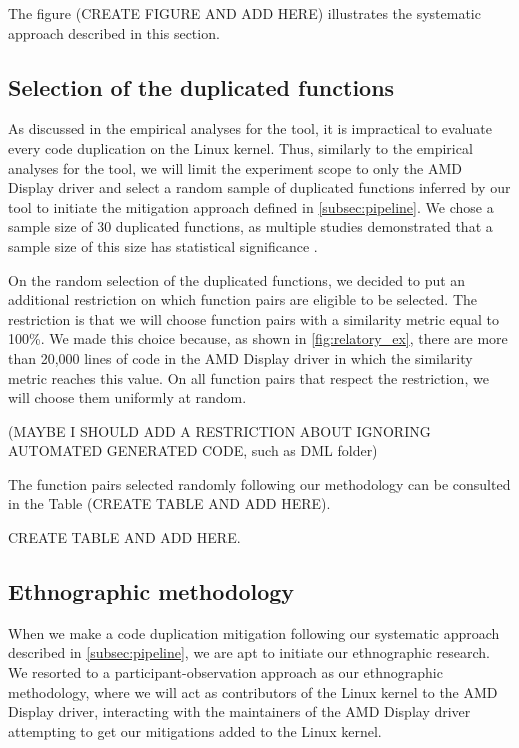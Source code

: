 The figure (CREATE FIGURE AND ADD HERE) illustrates the systematic approach described in this section.

\subsection{Selection of the duplicated functions}

As discussed in the empirical analyses for the tool, it is impractical to evaluate every code 
duplication on the Linux kernel. Thus, similarly to the empirical analyses for the tool, we will 
limit the experiment scope to only the AMD Display driver and select a random sample of duplicated 
functions inferred by our tool to initiate the mitigation approach defined in \ref{subsec:pipeline}. 
We chose a sample size of 30 duplicated functions, as multiple studies demonstrated that a sample 
size of this size has statistical significance \citep{sample1,sample2}.

On the random selection of the duplicated functions, we decided to put an additional restriction 
on which function pairs are eligible to be selected. The restriction is that we will choose function 
pairs with a similarity metric equal to 100\%. We made this choice because, as shown in \ref{fig:relatory_ex},
there are more than 20,000 lines of code in the AMD Display driver in which the similarity metric 
reaches this value. On all function pairs that respect the restriction, we will choose them 
uniformly at random.

(MAYBE I SHOULD ADD A RESTRICTION ABOUT IGNORING AUTOMATED GENERATED CODE, such as DML folder)

The function pairs selected randomly following our methodology can be consulted in the Table
(CREATE TABLE AND ADD HERE).

CREATE TABLE AND ADD HERE.

\subsection{Ethnographic methodology}

When we make a code duplication mitigation following our systematic approach described in 
\ref{subsec:pipeline}, we are apt to initiate our ethnographic research. We resorted to a
participant-observation approach as our ethnographic methodology, where we will act as 
contributors of the Linux kernel to the AMD Display driver, interacting with the maintainers 
of the AMD Display driver attempting to get our mitigations added to the Linux kernel. 

